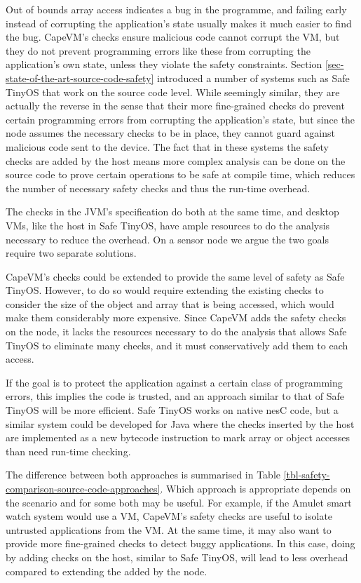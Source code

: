 Out of bounds array access indicates a bug in the programme, and failing early instead of corrupting the application's state usually makes it much easier to find the bug. CapeVM's checks ensure malicious code cannot corrupt the VM, but they do not prevent programming errors like these from corrupting the application's own state, unless they violate the safety constraints. Section \ref{sec-state-of-the-art-source-code-safety} introduced a number of systems such as Safe TinyOS \cite{Cooprider:2007ub} that work on the source code level. While seemingly similar, they are actually the reverse in the sense that their more fine-grained checks do prevent certain programming errors from corrupting the application's state, but since the node assumes the necessary checks to be in place, they cannot guard against malicious code sent to the device. The fact that in these systems the safety checks are added by the host means more complex analysis can be done on the source code to prove certain operations to be safe at compile time, which reduces the number of necessary safety checks and thus the run-time overhead.

The checks in the JVM's specification do both at the same time, and desktop VMs, like the host in Safe TinyOS, have ample resources to do the analysis necessary to reduce the overhead. On a sensor node we argue the two goals require two separate solutions.

CapeVM's checks could be extended to provide the same level of safety as Safe TinyOS. However, to do so would require extending the existing checks to consider the size of the object and array that is being accessed, which would make them considerably more expensive. Since CapeVM adds the safety checks on the node, it lacks the resources necessary to do the analysis that allows Safe TinyOS to eliminate many checks, and it must conservatively add them to each access.

If the goal is to protect the application against a certain class of programming errors, this implies the code is trusted, and an approach similar to that of Safe TinyOS will be more efficient. Safe TinyOS works on native nesC code, but a similar system could be developed for Java where the checks inserted by the host are implemented as a new bytecode instruction to mark array or object accesses than need run-time checking.

The difference between both approaches is summarised in Table \ref{tbl-safety-comparison-source-code-approaches}. Which approach is appropriate depends on the scenario and for some both may be useful. For example, if the Amulet smart watch system would use a VM, CapeVM's safety checks are useful to isolate untrusted applications from the VM. At the same time, it may also want to provide more fine-grained checks to detect buggy applications. In this case, doing by adding checks on the host, similar to Safe TinyOS, will lead to less overhead compared to extending the added by the node.




